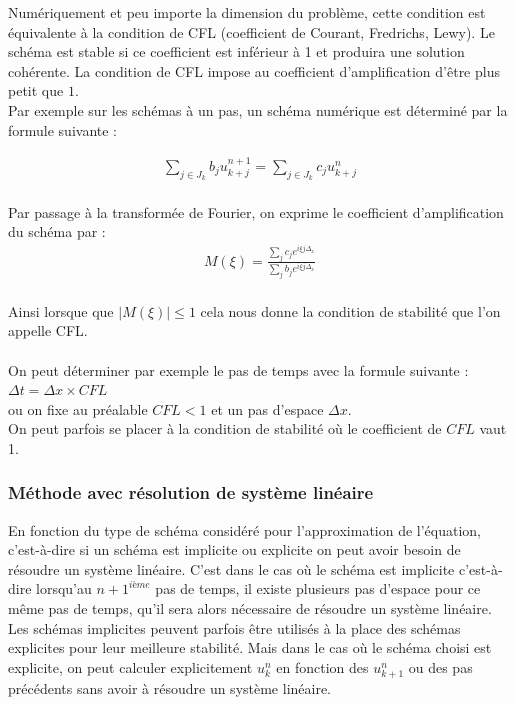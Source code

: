 \documentclass[12pt]{article}
\begin{document}
\noindent Numériquement et peu importe la dimension du problème, cette condition est équivalente à la condition de CFL \cite{ref9} (coefficient de Courant, Fredrichs, Lewy).
Le schéma est stable si ce coefficient est inférieur à 1 et produira une solution cohérente. 
La condition de CFL impose au coefficient d'amplification d'être plus petit que $1$.
\\Par exemple sur les schémas à un pas, un schéma numérique est déterminé par la formule suivante :

\begin{eqnarray*}
    \sum_{j\in J_k} b_ju_{k+j}^{n+1} = \sum_{j\in J_k} c_ju_{k+j}^{n} 
\end{eqnarray*}
\\Par passage à la transformée de Fourier, on exprime le coefficient d'amplification du schéma par :
\begin{eqnarray*}
     M(\xi)=\frac{\sum_j c_j e^{i\xi j \Delta_x}}{\sum_j b_j e^{i \xi j\Delta_x }}
\end{eqnarray*}
\\Ainsi lorsque que $|M(\xi)|\leq 1$ cela nous donne la condition de stabilité que l'on appelle CFL.
\\
\\
On peut déterminer par exemple le pas de temps avec la formule suivante :
$\Delta t = \Delta x \times CFL$
\\ou on fixe au préalable $CFL<1$ et un pas d'espace $\Delta x$.
\\On peut parfois se placer à la condition de stabilité où le coefficient de $CFL$ vaut 1.
\\
\subsubsection{Méthode avec résolution de système linéaire}\noindent En fonction du type de schéma considéré pour l'approximation de l'équation,  c'est-à-dire si un schéma est implicite ou explicite on peut avoir besoin de résoudre un système linéaire. C'est dans le cas où le schéma est implicite c'est-à-dire lorsqu'au $n+1^{ième}$ pas de temps, il existe plusieurs pas d'espace pour ce même pas de temps, qu'il sera alors nécessaire de résoudre un système linéaire.
Les schémas implicites peuvent parfois être utilisés à la place des schémas explicites pour leur meilleure stabilité. 
Mais dans le cas où le schéma choisi est explicite, on peut calculer explicitement $u_k^n$ en fonction des $u_{k+1}^{n}$ ou des pas précédents sans avoir à résoudre un système linéaire.
\end{document}
